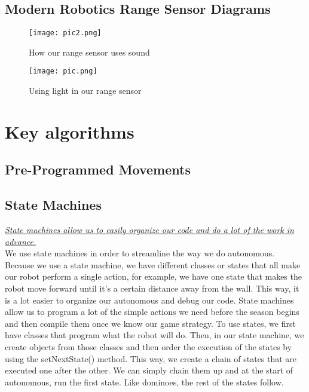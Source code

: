 \documentclass{article}[12pt]
\begin{document}


\subsection{Modern Robotics Range Sensor Diagrams}
\begin{center}
 \begin{figure}[!htb]
{\texttt{[image: pic2.png]}}
\caption{How our range sensor uses sound}
{\texttt{[image: pic.png]}}
\caption{Using light in our range sensor}
\end{figure}
\end{center}



\clearpage
\section{Key algorithms}

\subsection{Pre-Programmed Movements}

\subsection{State Machines}
\textit{\underline{State machines allow us to easily organize our code and do a lot of the work in advance.}} \\

We use state machines in order to streamline the way we do autonomous. Because we use a state machine, we have different classes or states that all make our robot perform a single action, for example, we have one state that makes the robot move forward until it’s a certain distance away from the wall. This way, it is a lot easier to organize our autonomous and debug our code.  State machines allow us to program a lot of the simple actions we need before the season begins and then compile them once we know our game strategy. To use states, we first have classes that program what the robot will do. Then, in our state machine, we create objects from those classes and then order the execution of the states by using the setNextState() method. This way, we create a chain of states that are executed one after the other. We can simply chain them up and at the start of autonomous, run the first state. Like dominoes, the rest of the states follow. 
\end{document}
